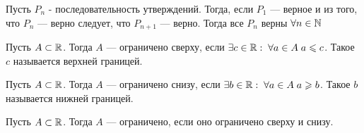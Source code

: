 Пусть $P_n$ - последовательность утверждений. Тогда, если  $P_1$ --- верное и из того, что $P_n$ --- верно следует, что  $P_{n+1}$ --- верно. Тогда все $P_n$ верны  $\forall n \in \mathbb{N}$

\begin{definition}
    Пусть $A \subset \mathbb{R}$. Тогда  $A$ --- ограничено сверху, если  $\exists c \in \mathbb{R}: \; \forall a \in A\; a \leqslant c$. Такое  $c$ называется верхней границей.
\end{definition}
\begin{definition}
    Пусть $A \subset \mathbb{R}$. Тогда  $A$ --- ограничено снизу, если  $\exists b \in \mathbb{R}: \; \forall a \in A\; a \geqslant b$. Такое  $b$ называется нижней границей.
\end{definition}
\begin{definition}
    Пусть $A \subset \mathbb{R}$. Тогда  $A$ --- ограничено, если оно ограничено сверху и снизу.
\end{definition}

